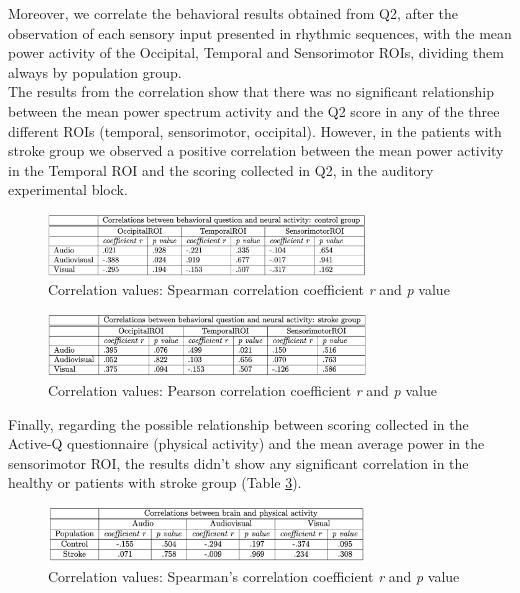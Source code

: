 Moreover, we  correlate the behavioral results obtained from Q2, after the observation of each sensory input presented in rhythmic sequences, with the mean power activity  of the Occipital, Temporal and Sensorimotor ROIs, dividing them always by population group.\\
The results from the correlation show that there was no significant relationship between the mean power spectrum activity and the Q2 score in any of the three different ROIs (temporal, sensorimotor, occipital).  However, in the patients with stroke group we observed a positive correlation between the mean power activity in the Temporal ROI and the scoring collected in Q2, in the auditory experimental block.
\begin{figure}[H]
    \centering
    \includegraphics[width=0.75\textwidth]{scatter_plots/correlation_q2_control.png}
    \caption{Correlation values: Spearman correlation coefficient \textit{r} and \textit{p} value}
    \label{fig: correlation values q2: control} 
\end{figure}

\begin{figure}[H]
    \centering
    \includegraphics[width=0.75\textwidth]{scatter_plots/correlation_q2_stroke.png}
    \caption{Correlation values: Pearson correlation coefficient \textit{r} and \textit{p} value}
    \label{fig correlation values q2: stroke} 
\end{figure}

Finally, regarding the possible relationship between scoring collected in the Active-Q questionnaire (physical activity) and the mean average power in the sensorimotor ROI, the results didn’t show any significant correlation in the healthy or patients with stroke group (Table \ref{fig: significance correlation activeq}). 
\begin{figure}[H]
    \centering
    \includegraphics[width=0.75\textwidth]{significance_tables/correlation_activeq_.png}
    \caption{Correlation values: Spearman's correlation coefficient \textit{r} and \textit{p} value}
    \label{fig: significance correlation activeq} 
\end{figure}


